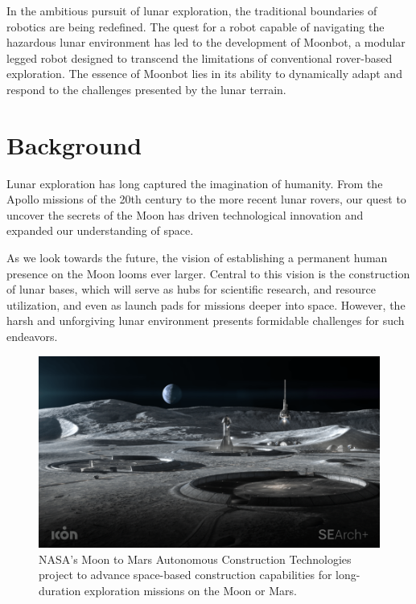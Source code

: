 In the ambitious pursuit of lunar exploration, the traditional boundaries of robotics are being redefined. The quest for a robot capable of navigating the hazardous lunar environment has led to the development of Moonbot, a modular legged robot designed to transcend the limitations of conventional rover-based exploration. The essence of Moonbot lies in its ability to dynamically adapt and respond to the challenges presented by the lunar terrain.\\

\section{Background}\label{sec:background}
\indent
Lunar exploration has long captured the imagination of humanity. From the Apollo missions \cite{apollo} of the 20th century to the more recent lunar rovers, our quest to uncover the secrets of the Moon has driven technological innovation and expanded our understanding of space.

As we look towards the future, the vision of establishing a permanent human presence on the Moon looms ever larger. Central to this vision is the construction of lunar bases, which will serve as hubs for scientific research, and resource utilization, and even as launch pads for missions deeper into space. However, the harsh and unforgiving lunar environment presents formidable challenges for such endeavors.

\begin{figure}[h]
  \centering
  \includegraphics[width=140mm]{./fig/intro/lunarconstruct.png}
  \vspace{2mm}
  \caption{NASA’s Moon to Mars Autonomous Construction Technologies project to advance space-based construction capabilities for long-duration exploration missions on the Moon or Mars. \cite{nasa_construct}}\label{lunar construct}
\end{figure}

